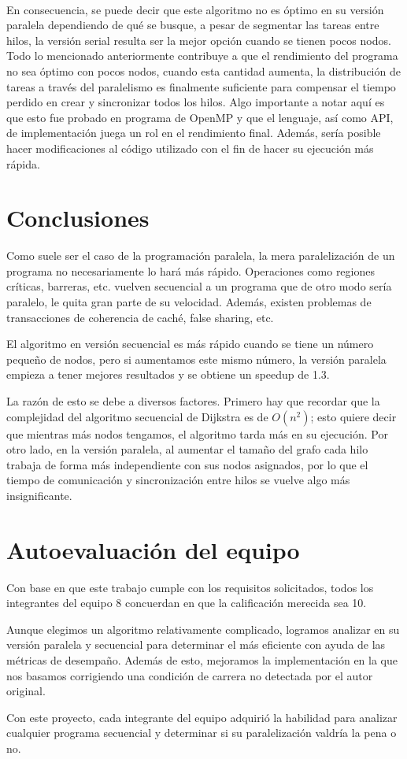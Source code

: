 \documentclass[11pt]{article}
\begin{document}
\paragraph{}
En consecuencia, se puede decir que este algoritmo no es óptimo en su versión paralela dependiendo de qué se busque, a pesar de segmentar las tareas entre hilos, la versión serial resulta ser la mejor opción cuando se tienen pocos nodos. Todo lo mencionado anteriormente contribuye a que el rendimiento del programa no sea óptimo con pocos nodos, cuando esta cantidad aumenta, la distribución de tareas a través del paralelismo es finalmente suficiente para compensar el tiempo perdido en crear y sincronizar todos los hilos. Algo importante a notar aquí es que esto fue probado en programa de OpenMP y que el lenguaje, así como API, de implementación juega un rol en el rendimiento final. Además, sería posible hacer modificaciones al código utilizado con el fin de hacer su ejecución más rápida.

\section{Conclusiones}
Como suele ser el caso de la programación paralela, la mera paralelización de un programa no necesariamente lo hará más rápido. Operaciones como regiones críticas, barreras, etc. vuelven secuencial a un programa que de otro modo sería paralelo, le quita gran parte de su velocidad. Además, existen problemas de transacciones de coherencia de caché, false sharing, etc.
\par
El algoritmo en versión secuencial es más rápido cuando se tiene un número pequeño de nodos, pero si aumentamos este mismo número, la versión paralela empieza a tener mejores resultados y se obtiene un speedup de 1.3.
\par
La razón de esto se debe a diversos factores. Primero hay que recordar que la complejidad del algoritmo secuencial de Dijkstra es de $O(n^2)$; esto quiere decir que mientras más nodos tengamos, el algoritmo tarda más en su ejecución. Por otro lado, en la versión paralela, al aumentar el tamaño del grafo cada hilo trabaja de forma más independiente con sus nodos asignados, por lo que el tiempo de comunicación y sincronización entre hilos se vuelve algo más insignificante. 

\section{Autoevaluación del equipo}
Con base en que este trabajo cumple con los requisitos solicitados, todos los integrantes del equipo 8 concuerdan en que la calificación merecida sea 10.
\par 
Aunque elegimos un algoritmo relativamente complicado, logramos analizar en su versión paralela y secuencial para determinar el más eficiente con ayuda de las métricas de desempaño. Además de esto, mejoramos la implementación en la que nos basamos corrigiendo una condición de carrera no detectada por el autor original.
\par 
Con este proyecto, cada integrante del equipo adquirió la habilidad para analizar cualquier programa secuencial y determinar si su paralelización valdría la pena o no.
\end{document}
